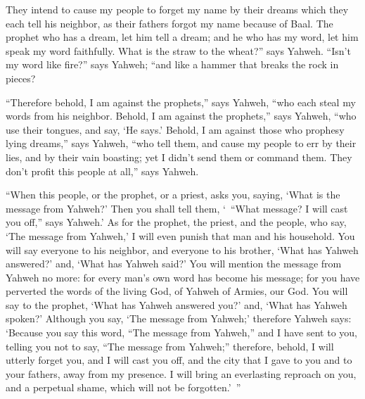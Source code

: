 {They intend to cause my people to forget my name by their dreams which they each tell his neighbor, as their fathers forgot my name because of Baal.
The prophet who has a dream, let him tell a dream; and he who has my word, let him speak my word faithfully. What is the straw to the wheat?” says Yahweh.
“Isn’t my word like fire?” says Yahweh; “and like a hammer that breaks the rock in pieces?
\par }{\PP {}“Therefore behold, I am against the prophets,” says Yahweh, “who each steal my words from his neighbor.
Behold, I am against the prophets,” says Yahweh, “who use their tongues, and say, ‘He says.’
Behold, I am against those who prophesy lying dreams,” says Yahweh, “who tell them, and cause my people to err by their lies, and by their vain boasting; yet I didn’t send them or command them. They don’t profit this people at all,” says Yahweh.
\par }{\PP {}“When this people, or the prophet, or a priest, asks you, saying, ‘What is the message from Yahweh?’ Then you shall tell them, ‘ “What message? I will cast you off,” says Yahweh.’
As for the prophet, the priest, and the people, who say, ‘The message from Yahweh,’ I will even punish that man and his household.
You will say everyone to his neighbor, and everyone to his brother, ‘What has Yahweh answered?’ and, ‘What has Yahweh said?’
You will mention the message from Yahweh no more: for every man’s own word has become his message; for you have perverted the words of the living God, of Yahweh of Armies, our God.
You will say to the prophet, ‘What has Yahweh answered you?’ and, ‘What has Yahweh spoken?’
Although you say, ‘The message from Yahweh;’ therefore Yahweh says: ‘Because you say this word, “The message from Yahweh,” and I have sent to you, telling you not to say, “The message from Yahweh;”
therefore, behold, I will utterly forget you, and I will cast you off, and the city that I gave to you and to your fathers, away from my presence.
I will bring an everlasting reproach on you, and a perpetual shame, which will not be forgotten.’ ”

}

